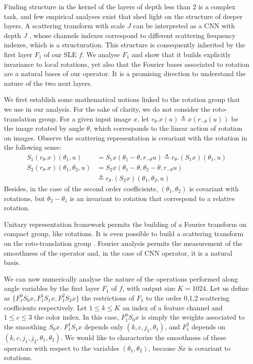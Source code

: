 \documentclass[10pt,twocolumn,letterpaper]{article}
\begin{document}
Finding structure in the kernel of the layers of depth less than $2$ \cite{waldspurger2015these,zeiler2014visualizing} is  a complex task, and few empirical analyses exist that shed light on the structure \cite{jacobsen2017multiscale} of deeper layers. A scattering transform with scale $J$ can be interpreted as a CNN with depth $J$ \cite{oyallon2015deep}, whose  channels indexes correspond to different scattering frequency indexes, which is a structuration. This structure is consequently inherited by the first layer $F_1$ of our SLE $f$. We analyse $F_1$ and show that it builds explicitly invariance to local rotations, yet also that the Fourier bases associated to rotation are a natural bases of our operator. It is a promising direction to understand the nature of the two next layers.

We first establish some mathematical notions linked to the rotation group that we use in our analysis. For the sake of clarity, we do not consider the roto-translation group.
For a given input image $x$, let $r_\theta . x(u)\triangleq x(r_{-\theta }(u))$ be the image  rotated by angle $\theta$, which corresponds to  the linear action of rotation on images. Observe the scattering representation is  covariant with the rotation in the following sense:
\begin{align*}
S_1(r_\theta.x)(\theta_1,u) &= S_1x(\theta_1-\theta,r_{-\theta}u)\triangleq r_\theta.(S_1x)(\theta_1,u)\\
S_2(r_\theta.x)(\theta_1,\theta_2,u)&=S_2x(\theta_1-\theta,\theta_2-\theta,r_{-\theta}u)\\
&\triangleq r_\theta.(S_2x)(\theta_1,\theta_2,u)
\end{align*}
Besides, in the case of the second order coefficients, $(\theta_1,\theta_2)$ is covariant with rotations, but $\theta_2-\theta_1$ is an invariant to rotation that correspond to a relative rotation. 

Unitary representation framework \cite{sugiura1990unitary} permits the building of a Fourier transform on compact group, like rotations. It is even possible to build a scattering transform on the roto-translation group \cite{sifre2013rotation}. Fourier analysis permits the measurement of the smoothness of the operator and, in the case of CNN operator, it is a natural basis.





We can now numerically analyse the nature of the operations performed along angle variables by the first layer $F_1$ of $f$, with output size $K=1024$. Let us define as $\{F^0_1S_0x,F^1_1S_1x,F^2_1S_2x\}$ the restrictions of $F_1$ to the order 0,1,2 scattering coefficients respectively. Let $1\leq k \leq K$ an index of a feature channel and $1\leq c\leq 3$ the color index. In this case, $F^0_1S_0x$ is simply the weights associated to the smoothing $S_0x$. $F^1_1S_1x$ depends only $(k,c,j_1,\theta_1)$, and $F^2_1$ depends on $(k,c,j_1,j_2,\theta_1,\theta_2)$. We would like to characterize the smoothness of these operators with respect to the variables $(\theta_1,\theta_2)$, because $Sx$ is covariant to rotations.
\end{document}
